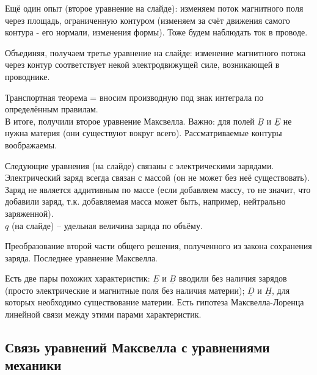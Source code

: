 \documentclass[main.tex]{subfiles}
\begin{document}
Ещё один опыт (второе уравнение на слайде): изменяем поток магнитного поля через площадь, ограниченную контуром (изменяем за счёт движения самого контура - его нормали, изменения формы). Тоже будем наблюдать ток в проводе.

Объединяя, получаем третье уравнение на слайде: изменение магнитного потока через контур соответствует некой электродвижущей силе, возникающей в проводнике. 


Транспортная теорема = вносим производную под знак интеграла по определённым правилам.\\

В итоге, получили второе уравнение Максвелла. Важно: для полей $\underline{B}$ и $\underline{E}$ не нужна материя (они существуют вокруг всего). Рассматриваемые контуры воображаемы.


Следующие уравнения (на слайде) связаны с электрическими зарядами.\\

Электрический заряд всегда связан с массой (он не может без неё существовать). Заряд не является аддитивным по массе (если добавляем массу, то не значит, что добавили заряд, т.к. добавляемая масса может быть, например, нейтрально заряженной).\\

$q$ (на слайде) -- удельная величина заряда по объёму.



Преобразование второй части общего решения, полученного из закона сохранения заряда. Последнее уравнение Максвелла.

Есть две пары похожих характеристик: $\underline{E}$ и $\underline{B}$ вводили без наличия зарядов (просто электрические и магнитные поля без наличия материи); $\underline{D}$ и $\underline{H}$, для которых необходимо существование материи. Есть гипотеза Максвелла-Лоренца линейной связи между этими парами характеристик.






\subsection{Связь уравнений Максвелла с уравнениями механики}
\end{document}
